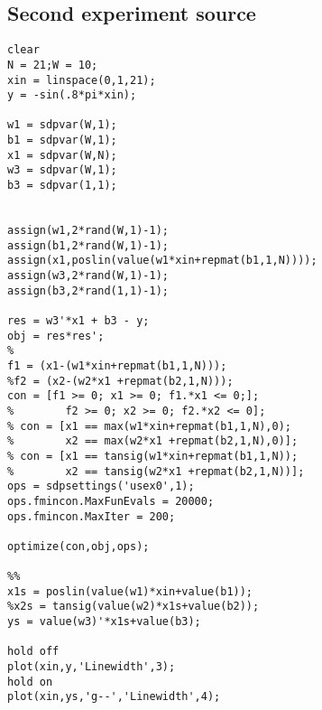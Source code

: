 \subsection{Second experiment source}
\begin{verbatim}
clear
N = 21;W = 10;
xin = linspace(0,1,21);
y = -sin(.8*pi*xin);

w1 = sdpvar(W,1);
b1 = sdpvar(W,1);
x1 = sdpvar(W,N);
w3 = sdpvar(W,1);
b3 = sdpvar(1,1);


assign(w1,2*rand(W,1)-1);
assign(b1,2*rand(W,1)-1);
assign(x1,poslin(value(w1*xin+repmat(b1,1,N))));
assign(w3,2*rand(W,1)-1);
assign(b3,2*rand(1,1)-1);

res = w3'*x1 + b3 - y;
obj = res*res';
% 
f1 = (x1-(w1*xin+repmat(b1,1,N)));
%f2 = (x2-(w2*x1 +repmat(b2,1,N)));
con = [f1 >= 0; x1 >= 0; f1.*x1 <= 0;];
%        f2 >= 0; x2 >= 0; f2.*x2 <= 0];
% con = [x1 == max(w1*xin+repmat(b1,1,N),0);
%        x2 == max(w2*x1 +repmat(b2,1,N),0)];
% con = [x1 == tansig(w1*xin+repmat(b1,1,N));
%        x2 == tansig(w2*x1 +repmat(b2,1,N))];
ops = sdpsettings('usex0',1);
ops.fmincon.MaxFunEvals = 20000;
ops.fmincon.MaxIter = 200;

optimize(con,obj,ops);

%%
x1s = poslin(value(w1)*xin+value(b1));
%x2s = tansig(value(w2)*x1s+value(b2));
ys = value(w3)'*x1s+value(b3);

hold off
plot(xin,y,'Linewidth',3);
hold on
plot(xin,ys,'g--','Linewidth',4);

\end{verbatim}

